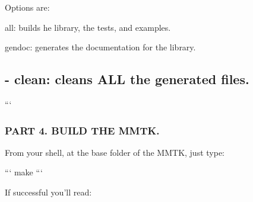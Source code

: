 \begin{DoxyPre}Options are:
\begin{DoxyItemize}
\item all: builds he library, the tests, and examples.
\end{DoxyItemize}\end{DoxyPre}



\begin{DoxyPre}
\begin{DoxyItemize}
\item gendoc: generates the documentation for the library.
\end{DoxyItemize}\end{DoxyPre}



\begin{DoxyPre}\subsection*{- clean: cleans ALL the generated files.
}\end{DoxyPre}



\begin{DoxyPre}
```\end{DoxyPre}



\begin{DoxyPre}\subsubsection*{PART 4. BUILD THE MMTK.}\end{DoxyPre}



\begin{DoxyPre}\end{DoxyPre}



\begin{DoxyPre}From your shell, at the base folder of the MMTK, just type:\end{DoxyPre}



\begin{DoxyPre}```
make
```\end{DoxyPre}



\begin{DoxyPre}If successful you'll read:\end{DoxyPre}



